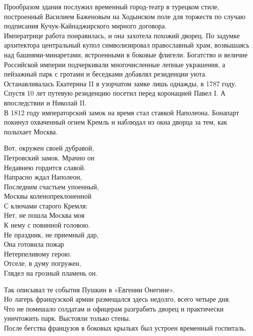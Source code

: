 Прообразом здания послужил временный город-театр в турецком стиле, построенный Василием Баженовым на Ходынском поле для торжеств по случаю подписания Кучук-Кайнаджирского мирного договора.\\
 Императрице работа понравилась, и она захотела похожий дворец. По задумке архитектора центральный купол символизировал православный храм, возвышаясь над башнями-минаретами, встроенными в боковые флигели. Богатство и величие Российской империи подчеркивали многочисленные лепные украшения, а пейзажный парк с гротами и беседками добавлял резиденции уюта.
Останавливалась Екатерина II в узорчатом замке лишь однажды, в 1787 году.\\
Спустя 10 лет путевую резиденцию посетил перед коронацией Павел I. А впоследствии и Николай II.\\
В 1812 году императорский замок на время стал ставкой Наполеона. Бонапарт покинул охваченный огнем Кремль и наблюдал из окна дворца за тем, как полыхает Москва.

Вот, окружен своей дубравой,\\
Петровский замок. Мрачно он\\ 
Недавнею гордится славой.\\
Напрасно ждал Наполеон,\\
Последним счастьем упоенный,\\
Москвы коленопреклоненной\\
С ключами старого Кремля:\\
Нет, не пошла Москва моя\\
К нему с повинной головою.\\
Не праздник, не приемный дар,\\
Она готовила пожар\\
Нетерпеливому герою.\\
Отселе, в думу погружен,\\
Глядел на грозный пламень он.

Так описывал те события Пушкин в «Евгении Онегине».\\
Но лагерь французской армии размещался здесь недолго, всего четыре дня.\\
Что не помешало солдатам и офицерам разграбить дворец и практически уничтожить парк. Выстояли только стены.\\
После бегства французов в боковых крыльях был устроен временный госпиталь.




